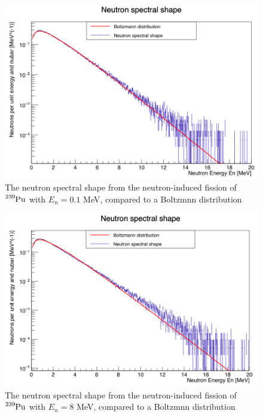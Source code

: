 \documentclass[]{article}
\begin{document}
\begin{figure} [H]
	\centering
	\includegraphics[scale=0.36]{Pu239_0_1_n_spectral_shape.png}
	\caption{The neutron spectral shape from the neutron-induced fission of $\ce{^{239}Pu}$ with $E_n = 0.1$ MeV, compared to a Boltzmnn distribution}
	\label{fig:Pu239_0_1_n_spectral_shape}
\end{figure}

\begin{figure} [H]
	\centering
	\includegraphics[scale=0.36]{Pu239_8_n_spectral_shape.png}
	\caption{The neutron spectral shape from the neutron-induced fission of $\ce{^{239}Pu}$ with $E_n = 8$ MeV, compared to a Boltzmnn distribution}
	\label{fig:Pu239_8_n_spectral_shape}
\end{figure}
\end{document}
